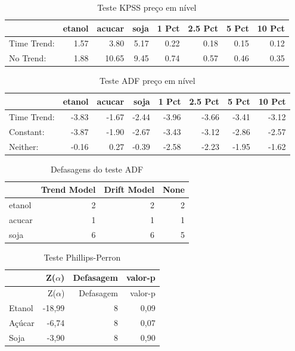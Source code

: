 \begin{longtable}[t]{lrrrrrrr}
\caption{\label{tab:ADF e KPSS nivel}Teste KPSS preço em nível}\\
\toprule
  & etanol & acucar & soja & 1 Pct & 2.5 Pct & 5 Pct & 10 Pct\\
\midrule
Time Trend: & 1.57 & 3.80 & 5.17 & 0.22 & 0.18 & 0.15 & 0.12\\
No Trend: & 1.88 & 10.65 & 9.45 & 0.74 & 0.57 & 0.46 & 0.35\\
\bottomrule
\end{longtable}

\begin{longtable}[t]{lrrrrrrr}
\caption{\label{tab:ADF e KPSS nivel}Teste ADF preço em nível}\\
\toprule
  & etanol & acucar & soja & 1 Pct & 2.5 Pct & 5 Pct & 10 Pct\\
\midrule
Time Trend: & -3.83 & -1.67 & -2.44 & -3.96 & -3.66 & -3.41 & -3.12\\
Constant: & -3.87 & -1.90 & -2.67 & -3.43 & -3.12 & -2.86 & -2.57\\
Neither: & -0.16 & 0.27 & -0.39 & -2.58 & -2.23 & -1.95 & -1.62\\
\bottomrule
\end{longtable}

\begin{longtable}[t]{lrrr}
\caption{\label{tab:ADF e KPSS nivel}Defasagens do teste ADF}\\
\toprule
  & Trend Model & Drift Model & None\\
\midrule
etanol & 2 & 2 & 2\\
acucar & 1 & 1 & 1\\
soja & 6 & 6 & 5\\
\bottomrule
\end{longtable}

\begin{longtable}[]{@{}lrrr@{}}
\caption{Teste Phillips-Perron}\tabularnewline
\toprule
& Z(\(\alpha\)) & Defasagem & valor-p\tabularnewline
\midrule
\endfirsthead
\toprule
& Z(\(\alpha\)) & Defasagem & valor-p\tabularnewline
\midrule
\endhead
Etanol & -18,99 & 8 & 0,09\tabularnewline
Açúcar & -6,74 & 8 & 0,07\tabularnewline
Soja & -3,90 & 8 & 0,90\tabularnewline
\bottomrule
\end{longtable}

